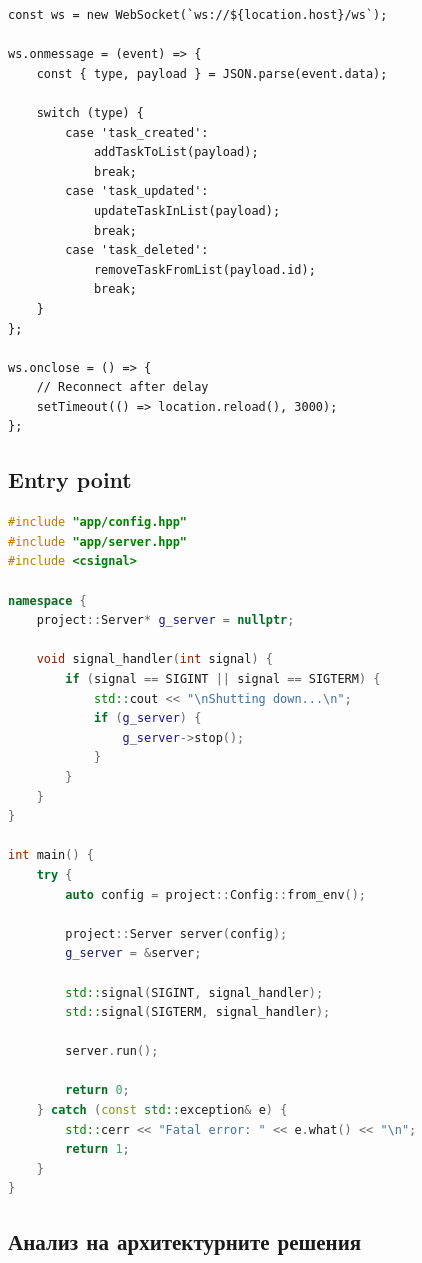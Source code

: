 \begin{lstlisting}[basicstyle=\small\ttfamily, caption={WebSocket client (JavaScript)}]
const ws = new WebSocket(`ws://${location.host}/ws`);

ws.onmessage = (event) => {
    const { type, payload } = JSON.parse(event.data);
    
    switch (type) {
        case 'task_created':
            addTaskToList(payload);
            break;
        case 'task_updated':
            updateTaskInList(payload);
            break;
        case 'task_deleted':
            removeTaskFromList(payload.id);
            break;
    }
};

ws.onclose = () => {
    // Reconnect after delay
    setTimeout(() => location.reload(), 3000);
};
\end{lstlisting}

\subsection{Entry point}

\begin{lstlisting}[language=C++, basicstyle=\small\ttfamily, caption={main.cpp}]
#include "app/config.hpp"
#include "app/server.hpp"
#include <csignal>

namespace {
    project::Server* g_server = nullptr;
    
    void signal_handler(int signal) {
        if (signal == SIGINT || signal == SIGTERM) {
            std::cout << "\nShutting down...\n";
            if (g_server) {
                g_server->stop();
            }
        }
    }
}

int main() {
    try {
        auto config = project::Config::from_env();
        
        project::Server server(config);
        g_server = &server;
        
        std::signal(SIGINT, signal_handler);
        std::signal(SIGTERM, signal_handler);
        
        server.run();
        
        return 0;
    } catch (const std::exception& e) {
        std::cerr << "Fatal error: " << e.what() << "\n";
        return 1;
    }
}
\end{lstlisting}

\subsection{Анализ на архитектурните решения}

